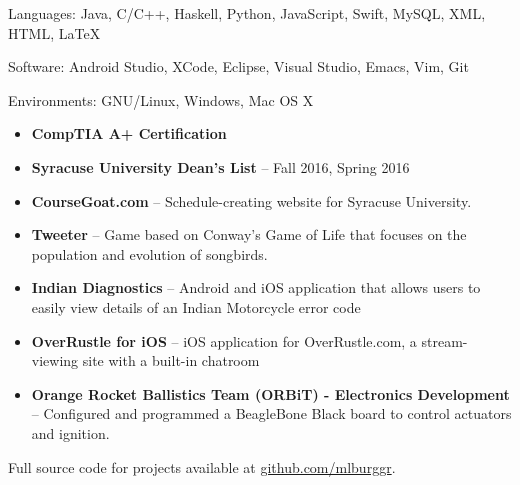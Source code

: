 \documentclass[10pt,a4paper]{article}
\begin{document}
\spacedhrule{-0.1em}{-0.4em}



\inlineheadsection  %
  {Languages:}
  {Java, C/C++, Haskell, Python, JavaScript, Swift, MySQL, XML, HTML, \LaTeX}

\vspace{0.5em}
\inlineheadsection
  {Software:}
  {Android Studio, XCode, Eclipse, Visual Studio, Emacs, Vim, Git}

\vspace{0.5em}
\inlineheadsection
  {Environments:}
  {GNU/Linux, Windows, Mac OS X}




\spacedhrule{1.2em}{-0.4em}

\begin{itemize}
\item \textbf{CompTIA A+ Certification}
\item \textbf{Syracuse University Dean's List }-- Fall 2016, Spring 2016
\end{itemize}


\spacedhrule{-0.6em}{-0.4em}

\begin{itemize}
\item \textbf{CourseGoat.com} -- Schedule-creating website for Syracuse University.
\item \textbf{Tweeter} -- Game based on Conway's Game of Life that focuses on the population and evolution of songbirds.
\item \textbf{Indian Diagnostics} -- Android and iOS application that allows users to easily view details of an Indian Motorcycle error code
\item \textbf{OverRustle for iOS} -- iOS application for OverRustle.com, a stream-viewing site with a built-in chatroom
\item \textbf{Orange Rocket Ballistics Team (ORBiT) - Electronics Development} -- Configured and programmed a BeagleBone Black board to control actuators and ignition.


\end{itemize}

Full source code for projects available at \href{https://github.com/mlburggr}{github.com/mlburggr}.
\end{document}
